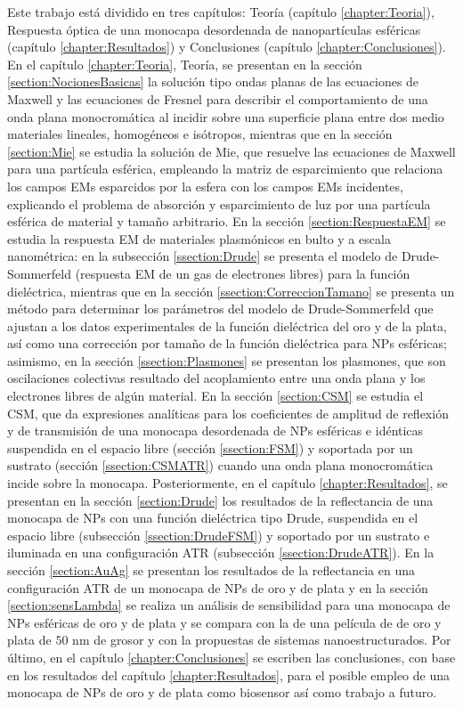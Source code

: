 Este trabajo está dividido en tres capítulos: Teoría (capítulo \ref{chapter:Teoria}), Respuesta óptica de una monocapa desordenada de nanopartículas esféricas (capítulo \ref{chapter:Resultados}) y Conclusiones (capítulo \ref{chapter:Conclusiones}). En el capítulo \ref{chapter:Teoria}, Teoría, se presentan en la sección \ref{section:NocionesBasicas} la solución tipo ondas planas de las ecuaciones de Maxwell y las ecuaciones de Fresnel para describir el comportamiento de una onda plana monocromática al incidir sobre una superficie plana entre dos medio materiales lineales, homogéneos e isótropos, mientras que en la sección \ref{section:Mie} se estudia la solución de Mie, que resuelve las ecuaciones de Maxwell para una partícula esférica, empleando la matriz de esparcimiento que relaciona los campos EMs esparcidos por la esfera con los campos EMs incidentes, explicando el problema de absorción y esparcimiento de luz por una partícula esférica de material y tamaño arbitrario. En la sección \ref{section:RespuestaEM} se estudia la respuesta EM de materiales plasmónicos en bulto y a escala nanométrica: en la subsección \ref{ssection:Drude} se presenta el modelo de Drude-Sommerfeld (respuesta EM de un gas de electrones libres) para la función dieléctrica, mientras que en la sección \ref{ssection:CorreccionTamano} se presenta un método para determinar los parámetros del modelo de Drude-Sommerfeld que ajustan a los datos experimentales de la función dieléctrica del oro y de la plata, así como una corrección por tamaño de la función dieléctrica para NPs esféricas; asimismo, en la sección \ref{ssection:Plasmones} se presentan los plasmones, que son oscilaciones colectivas resultado del acoplamiento entre una onda plana y los electrones libres de algún material. En la  sección \ref{section:CSM} se estudia el CSM, que da expresiones analíticas para los  coeficientes de amplitud de reflexión y de transmisión de una monocapa desordenada de NPs esféricas e idénticas suspendida en el espacio libre (sección \ref{ssection:FSM}) y  soportada por un sustrato (sección \ref{ssection:CSMATR}) cuando una onda plana monocromática incide sobre la monocapa. Posteriormente, en el capítulo \ref{chapter:Resultados}, se presentan en la sección \ref{section:Drude} los resultados de la reflectancia de una monocapa de NPs con una función dieléctrica tipo Drude, suspendida en el espacio libre (subsección \ref{ssection:DrudeFSM}) y soportado por un sustrato e iluminada en una configuración ATR (subsección \ref{ssection:DrudeATR}). En la sección \ref{section:AuAg} se presentan los resultados de la reflectancia en una configuración ATR de un monocapa de NPs de oro y de plata y en la sección \ref{section:sensLambda} se realiza un análisis de sensibilidad para una monocapa de NPs esféricas de oro y de plata y se compara con la de una película de de oro y plata de $50$ nm de grosor y con la propuestas de sistemas nanoestructurados. Por último, en el capítulo \ref{chapter:Conclusiones} se escriben las conclusiones, con base en los resultados del capítulo \ref{chapter:Resultados}, para el posible empleo de una monocapa de NPs de oro y de plata como biosensor así como trabajo a futuro.
